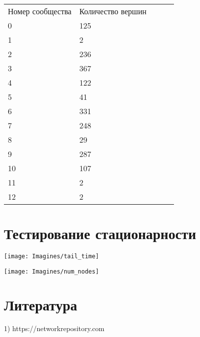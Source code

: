 \documentclass[reprint, amsmath, amssymb, aps,]{revtex4-2}
\begin{document}
\begin{table}[h!]
\begin{tabular}{|l|l|lll}
\cline{1-2}
Номер сообщества & Количество вершин &  &  &  \\ \cline{1-2}
0                & 125               &  &  &  \\ \cline{1-2}
1                & 2                 &  &  &  \\ \cline{1-2}
2                & 236               &  &  &  \\ \cline{1-2}
3                & 367               &  &  &  \\ \cline{1-2}
4                & 122               &  &  &  \\ \cline{1-2}
5                & 41                &  &  &  \\ \cline{1-2}
6                & 331               &  &  &  \\ \cline{1-2}
7                & 248               &  &  &  \\ \cline{1-2}
8                & 29                &  &  &  \\ \cline{1-2}
9                & 287               &  &  &  \\ \cline{1-2}
10               & 107               &  &  &  \\ \cline{1-2}
11               & 2                 &  &  &  \\ \cline{1-2}
12               & 2                 &  &  &  \\ \cline{1-2}
\end{tabular}
\end{table}




\section{Тестирование стационарности}
\begin{center}
\centering 
\texttt{[image: Imagines/tail\_time]}
\end{center}


\begin{center}
\centering 
\texttt{[image: Imagines/num\_nodes]}
\end{center}




\section{Литература}
1) https://networkrepository.com
\end{document}
